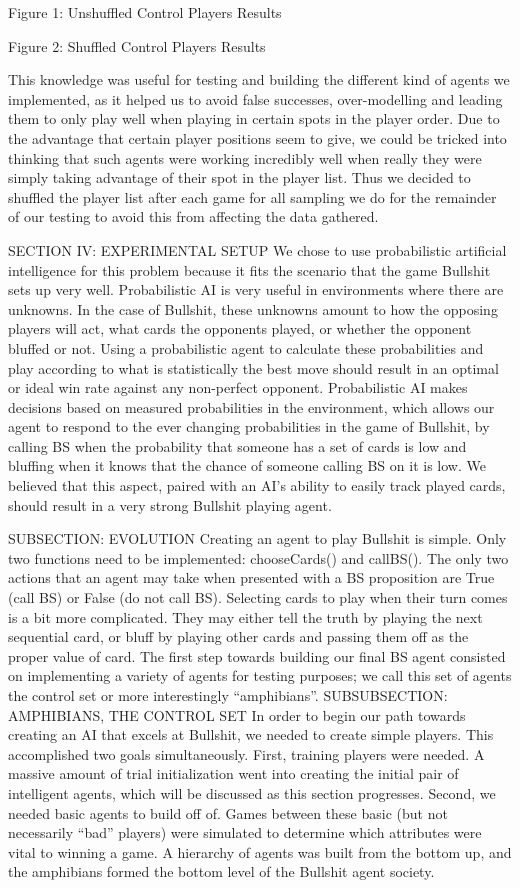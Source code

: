 \documentclass[a4paper,12pt]{article}
\begin{document}
Figure 1: Unshuffled Control Players Results

Figure 2: Shuffled Control Players Results

	 This knowledge was useful for testing and building the different kind of agents we implemented, as it helped us to avoid false successes, over-modelling and leading them to only play well when playing in certain spots in the player order. Due to the advantage that certain player positions seem to give, we could be tricked into thinking that such agents were working incredibly well when really they were simply taking advantage of their spot in the player list. Thus we decided to shuffled the player list after each game for all sampling we do for the remainder of our testing to avoid this from affecting the data gathered.

SECTION IV: EXPERIMENTAL SETUP
	We chose to use probabilistic artificial intelligence for this problem because it fits the scenario that the game Bullshit sets up very well. Probabilistic AI is very useful in environments where there are unknowns. In the case of Bullshit, these unknowns amount to how the opposing players will act, what cards the opponents played, or whether the opponent bluffed or not. Using a probabilistic agent to calculate these probabilities and play according to what is statistically the best move should result in an optimal or ideal win rate against any non-perfect opponent. Probabilistic AI makes decisions based on measured probabilities in the environment, which allows our agent to respond to the ever changing probabilities in the game of Bullshit, by calling BS when the probability that someone has a set of cards is low and bluffing when it knows that the chance of someone calling BS on it is low. We believed that this aspect, paired with an AI’s ability to easily track played cards, should result in a very strong Bullshit playing agent. 


	SUBSECTION: EVOLUTION
	Creating an agent to play Bullshit is simple. Only two functions need to be implemented: chooseCards() and callBS(). The only two actions that an agent may take when presented with a BS proposition are True (call BS) or False (do not call BS). Selecting cards to play when their turn comes is a bit more complicated. They may either tell the truth by playing the next sequential card, or bluff by playing other cards and passing them off as the proper value of card. The first step towards building our final BS agent consisted on implementing a variety of agents for testing purposes; we call this set of agents the control set or more interestingly “amphibians”.
	SUBSUBSECTION: AMPHIBIANS, THE CONTROL SET
	In order to begin our path towards creating an AI that excels at Bullshit, we needed to create simple players. This accomplished two goals simultaneously. First, training players were needed. A massive amount of trial initialization went into creating the initial pair of intelligent agents, which will be discussed as this section progresses. Second, we needed basic agents to build off of. Games between these basic (but not necessarily “bad” players) were simulated to determine which attributes were vital to winning a game. A hierarchy of agents was built from the bottom up, and the amphibians formed the bottom level of the Bullshit agent society.
\end{document}
